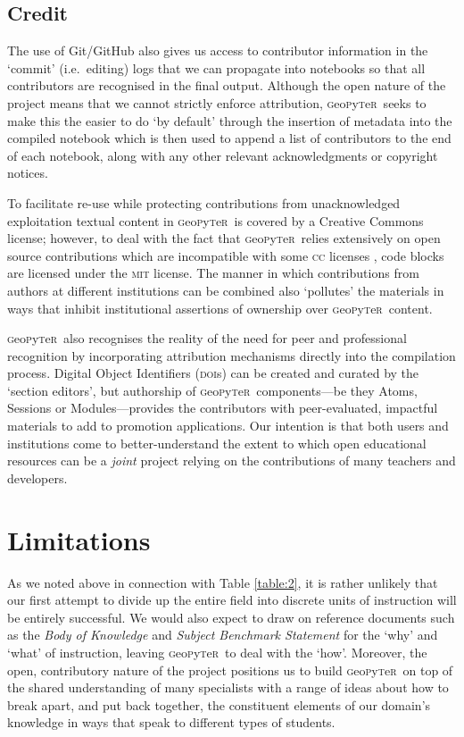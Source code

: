\documentclass[letter, 11pt,titlepage]{article}
\newcommand{\gp}{\textsc{g}eo\textsc{p}y\textsc{t}e\textsc{r}~\/}
\newcommand{\ie}{i.e.~\/}
\begin{document}
\subsection{Credit}

The use of Git/GitHub also gives us access to contributor information in the `commit' (\ie editing) logs that we can propagate into notebooks so that all contributors are recognised in the final output. Although the open nature of the project means that we cannot strictly enforce attribution, \gp seeks to make this the easier to do `by default' through the insertion of metadata into the compiled notebook which is then used to append a list of contributors to the end of each notebook, along with any other relevant acknowledgments or copyright notices.

To facilitate re-use while protecting contributions from unacknowledged exploitation textual content in \gp is covered by a Creative Commons license; however, to deal with the fact that \gp relies extensively on open source contributions which are incompatible with some \textsc{cc} licenses \citep[see discussion in][]{osswatch2013}, code blocks are licensed under the \textsc{mit} license. The manner in which contributions from authors at different institutions can be combined also `pollutes' the materials in ways that inhibit institutional assertions of ownership over \gp content.

\gp also recognises the reality of the need for peer and professional recognition by incorporating attribution mechanisms directly into the compilation process. Digital Object Identifiers (\textsc{doi}s) can be created and curated by the `section editors', but authorship of \gp components---be they Atoms, Sessions or Modules---provides the contributors with peer-evaluated, impactful materials to add to promotion applications. Our intention is that both users and institutions come to better-understand the extent to which open educational resources can be a \emph{joint} project relying on the contributions of many teachers and developers.

\section{Limitations}\label{limitations}

As we noted above in connection with Table \ref{table:2}, it is rather unlikely that our first attempt to divide up the entire field into discrete units of instruction will be entirely successful. We would also expect to draw on reference documents such as the \emph{Body of Knowledge} \citep{bok2018} and \emph{Subject Benchmark Statement} \citep{QAA2014} for the `why' and `what' of instruction, leaving \gp to deal with the `how'. Moreover, the open, contributory nature of the project positions us to build \gp on top of the shared understanding of many specialists with a range of ideas about how to break apart, and put back together, the constituent elements of our domain's  knowledge in ways that speak to different types of students.
\end{document}
